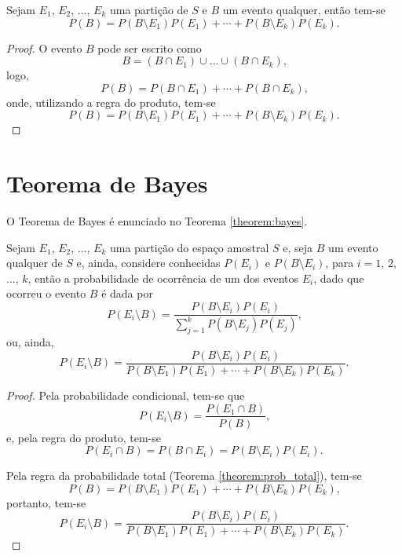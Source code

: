 \documentclass[11pt,fleqn]{book}
\numberwithin{mpicture}{chapter}
\numberwithin{mtable}{chapter}
\numberwithin{mframe}{chapter}
\begin{document}
\begin{theorem}
\label{theorem:prob_total}
	Sejam $E_1$, $E_2$, $\dots$, $E_k$ uma partição de $S$ e $B$ um evento qualquer, então tem-se
	\[
		P(B) = P(B\setminus E_1)P(E_1)
		+ \cdots
		+ P(B\setminus E_k)P(E_k)
		\text{.}
	\]

	\begin{proof}
	O evento $B$ pode ser escrito como
	\[
		B = (B\cap E_1)\cup \dots \cup (B\cap E_k)\text{,}
	\]
	logo,
	\[
		P(B)=P(B\cap E_1)+\cdots+P(B\cap E_k)\text{,}
	\]
	onde, utilizando a regra do produto, tem-se
	\[
		P(B)=P(B\setminus E_1)P(E_1)+\cdots+P(B\setminus E_k)P(E_k)\text{.}
	\]
	\end{proof}
\end{theorem}

\section{Teorema de Bayes}

O Teorema de Bayes é enunciado no Teorema \ref{theorem:bayes}.

\begin{theorem}
	\label{theorem:bayes}
	Sejam $E_1$, $E_2$, $\dots$, $E_k$ uma partição do espaço amostral $S$ e, seja $B$ um evento qualquer de $S$ e, ainda, considere conhecidas $P(E_i)$ e $P(B\setminus E_i)$, para $i=1$, $2$, $\dots$, $k$, então a probabilidade de ocorrência de um dos eventos $E_i$, dado que ocorreu o evento $B$ é dada por
	\[
		P(E_i\setminus B)=\frac{
			P(B\setminus E_i)P(E_i)
		} {
			\displaystyle \sum_{j=1}^{k} P(B\setminus E_j)P(E_j)
		}
		\text{,}
	\]
	ou, ainda,
	\[
		P(E_i\setminus B)=\frac{
			P(B\setminus E_i)P(E_i)
		}{
			P(B\setminus E_1)P(E_1)
			+
			\cdots
			+
			P(B\setminus E_k)P(E_k)
		}
		\text{.}
	\]
	
	\begin{proof}
		Pela probabilidade condicional, tem-se que
		\[
			P(E_i\setminus B)=\frac{P(E_1\cap B)}{P(B)}\text{,}
		\]
		e, pela regra do produto, tem-se
		\[
			P(E_i\cap B) = P(B\cap E_i)=P(B\setminus E_i)P(E_i)\text{.}
		\]
		
		Pela regra da probabilidade total (Teorema \ref{theorem:prob_total}), tem-se
		\[
			P(B) = P(B\setminus E_1)P(E_1)+\cdots + P(B\setminus E_k)P(E_k)\text{,}
		\]
		portanto, tem-se
		\[
			P(E_i\setminus B)=\frac{
				P(B\setminus E_i)P(E_i)
			}{
				P(B\setminus E_1)P(E_1)
				+
				\cdots
				+
				P(B\setminus E_k)P(E_k)
			}
			\text{.}
		\]
	\end{proof}
\end{theorem}
\end{document}
